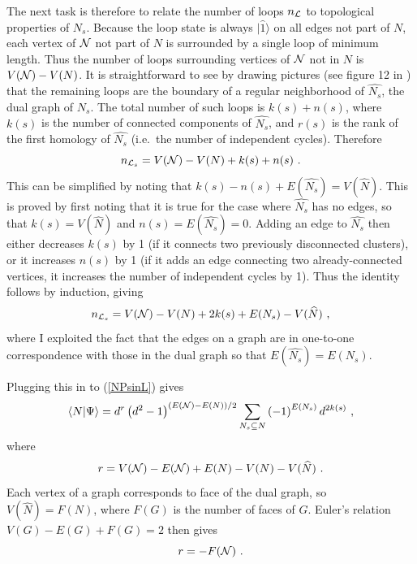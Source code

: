 \documentclass[11pt]{article}
\newcommand{\xxr}{|\widehat{1}\rangle}
\begin{document}
The next task is therefore to relate the number of loops $n_{\cal L}$
to topological properties of $N_s$. Because the loop state is always
$\xxr$ on all edges not part of $N$, each vertex of ${\cal N}$ not
part of $N$ is surrounded by a single loop of minimum length.
Thus the number of loops
surrounding vertices of ${\cal N}$ not in $N$ is $V({\cal N})-V(N)$.
It is straightforward to see by drawing pictures (see 
figure 12 in \cite{FKrush}) that the
remaining loops are the boundary of a regular neighborhood of
$\widehat{N_s}$, the dual graph of $N_s$.  The total number of such
loops is $k(s)+n(s)$, where $k(s)$ is the number of connected
components of $\widehat{N_s}$, and $r(s)$ is the rank of the first
homology of $\widehat{N_s}$ (i.e.\ the number of independent
cycles). Therefore
$$n_{{\cal L}_s} = V({\cal N})-V(N)+k(s)+n(s)\ .$$ This can be
simplified by noting that
$k(s)-n(s)+E(\widehat{N_s})=V(\widehat{N})$. This is proved by first
noting that it is true for the case where $\widehat{N_s}$ has no
edges, so that $k(s)=V(\widehat{N})$ and
$n(s)=E(\widehat{N_s})=0$. Adding an edge to $\widehat{N_s}$ then
either decreases $k(s)$ by 1 (if it connects two previously
disconnected clusters), or it increases $n(s)$ by 1 (if it adds an edge
connecting two already-connected vertices, it increases the number of
independent cycles by 1). Thus the identity follows by induction,
giving
$$n_{{\cal L}_s} = V({\cal N})-V(N)+2k(s)+ E({N_s})-V(\widehat{N})\ ,$$ 
where I exploited the fact that the edges on a graph are in one-to-one
correspondence with those in the dual graph so that
$E(\widehat{N_s})=E(N_s)$. 


Plugging this in to (\ref{NPsinL}) gives
$$\langle N|\Psi\rangle =
d^{r}
\left(d^2-1\right)^{(E({\cal N})-E(N))/2}
\sum_{{N_s}\subseteq {N}}
\left(-1\right)^{E(N_s)} d^{2k(s)}\ ,
$$
where
$$
r=V({\cal N})-E({\cal N})+E(N)-V(N)-V(\widehat{N})\ .
$$
Each vertex of a graph corresponds to face of the dual graph, so
$V(\widehat{N})=F(N)$, where $F(G)$ is the number of faces of $G$. 
Euler's relation $V(G)-E(G)+F(G)=2$ then gives
$$r= -F({\cal N})\ .$$ 
\end{document}
